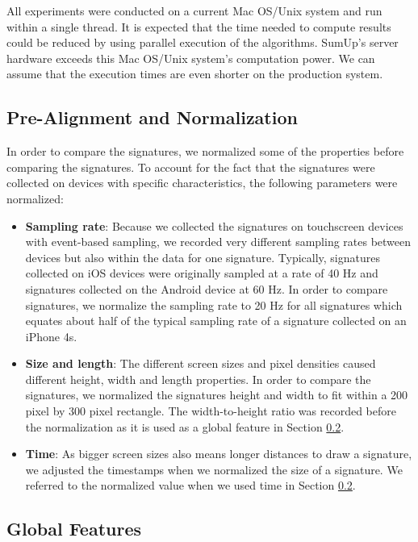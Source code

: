 \documentclass[a4paper, oneside]{csthesis}
\begin{document}
All experiments were conducted on a current Mac OS/Unix system and run within a single thread. It is expected that the time needed to compute results could be reduced by using parallel execution of the algorithms. SumUp's server hardware exceeds this Mac OS/Unix system's computation power. We can assume that the execution times are  even shorter on the production system.

\subsection{Pre-Alignment and Normalization}

In order to compare the signatures, we normalized some of the properties before comparing the signatures. To account for the fact that the signatures were collected on devices with specific characteristics, the following parameters were normalized:

\begin{itemize}
\item \textbf{Sampling rate}: Because we collected the signatures on touchscreen devices with event-based sampling, we recorded very different sampling rates between devices but also within the data for one signature. Typically, signatures collected on iOS devices were originally sampled at a rate of 40 Hz and signatures collected on the Android device at 60 Hz. In order to compare signatures, we normalize the sampling rate to 20 Hz for all signatures which equates about half of the typical sampling rate of a signature collected on an iPhone 4s.
\item \textbf{Size and length}: The different screen sizes and pixel densities caused different height, width and length properties. In order to compare the signatures, we normalized the signatures height and width to fit within a 200 pixel by 300 pixel rectangle. The width-to-height ratio was recorded before the normalization as it is used as a global feature in Section \ref{sec:global-features}.
\item \textbf{Time}: As bigger screen sizes also means longer distances to draw a signature, we adjusted the timestamps when we normalized the size of a signature. We referred to the normalized value when we used time in Section \ref{sec:global-features}.
\end{itemize}





\subsection{Global Features}
\label{sec:global-features}
\end{document}

